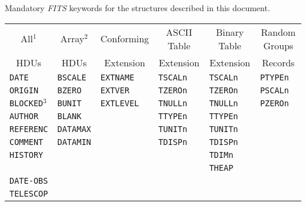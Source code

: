 \documentclass[11pt,makeidx]{book}     %
\begin{document}
\begin{table}[htpb]
\caption[Mandatory {\em FITS\/} keywords]                                        
         {Mandatory {\em FITS\/} keywords for the 
          structures described in this document.}                              
\end{table}              

\normalsize

\begin{table}[htpb]        
\begin{center}
\begin{tabular}{llllll}  \\ \hline \hline
\multicolumn{1}{c}{All$^{1}$}       & \multicolumn{1}{c}{Array$^{2}$} & 
\multicolumn{1}{c}{Conforming}   & \multicolumn{1}{c}{ASCII Table} & 
\multicolumn{1}{c}{Binary Table}& \multicolumn{1}{c}{Random Groups}
\\ 
\multicolumn{1}{c}{HDUs}      &\multicolumn{1}{c}{HDUs}        & 
\multicolumn{1}{c}{Extension}    & \multicolumn{1}{c}{Extension}   & 
\multicolumn{1}{c}{Extension}    & \multicolumn{1}{c}{Records}     \\
\hline
{\tt DATE}     & {\tt BSCALE}   & {\tt EXTNAME}   & {\tt TSCALn}    & {\tt TSCALn}   & {\tt PTYPEn}    \\ 
{\tt ORIGIN}   & {\tt BZERO}    & {\tt EXTVER}    & {\tt TZEROn}    & {\tt TZEROn}   & {\tt PSCALn}    \\
{\tt BLOCKED}$^{3}$ & {\tt BUNIT} & {\tt EXTLEVEL}  & {\tt TNULLn} & {\tt TNULLn} & {\tt PZEROn}       \\
{\tt AUTHOR}   & {\tt BLANK}    &                 & {\tt TTYPEn}    & {\tt TTYPEn}   &                \\
{\tt REFERENC} &  {\tt DATAMAX}  &                 & {\tt TUNITn}    & {\tt TUNITn}   &               \\
{\tt COMMENT}  &  {\tt DATAMIN}  &                 & {\tt TDISPn}    & {\tt TDISPn}   &               \\ 
{\tt HISTORY}  &                 &                 &                 & {\tt TDIMn}    &               \\    
\verb*+        +&                &                 &                 & {\tt THEAP}    &               \\       
{\tt DATE-OBS} &                 &                 &                 &                &               \\  
{\tt TELESCOP} &                 &                 &                 &                &               \\       

\end{tabular}
\end{center}
\end{table}
\end{document}
